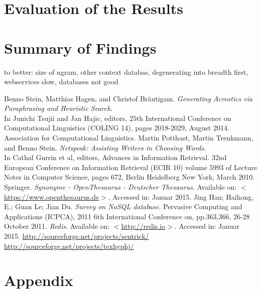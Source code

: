 \documentclass{reportAlternative}
\begin{document}
\chapter{Evaluation of the Results}

\chapter{Summary of Findings}
to better: size of ngram, other context databas, degenerating into breadth first, webservices slow, databases not good

\begin{thebibliography}{1}
	Benno Stein, Matthias Hagen, and Christof Bräutigam. \emph{Generating Acrostics via Paraphrasing and Heuristic Search}. \\
	In Junichi Tsujii and Jan Hajic, editors, 25th International Conference on Computational Linguistics (COLING 14), pages 2018-2029, August 2014. Association for Computational Linguistics. 
	Martin Potthast, Martin Trenkmann, and Benno Stein.
	\emph{Netspeak: Assisting Writers in Choosing Words}. \\
	In Cathal Gurrin et al, editors, Advances in Information Retrieval. 32nd European Conference on Information Retrieval (ECIR 10) volume 5993 of Lecture Notes in Computer Science, pages 672, Berlin Heidelberg New York, March 2010. Springer.
	\emph{Synonyme - OpenThesaurus - Deutscher Thesaurus}.
	Available on: $<$\url{https://www.openthesaurus.de}$>$.
	Accessed in: Januar 2015.
	Jing Han; Haihong, E.; Guan Le; Jian Du. \emph{Survey on NoSQL database}. Pervasive Computing and Applications (ICPCA), 2011 6th International Conference on, pp.363,366, 26-28 October 2011.
	\emph{Redis}.
	Available on: $<$\url{http://redis.io}$>$.
	Accessed in: Januar 2015.
\url{http://sourceforge.net/projects/sentrick/}
\url{http://sourceforge.net/projects/texhyphj/}
\end{thebibliography}

\appendix
\chapter{Appendix}
\end{document}
